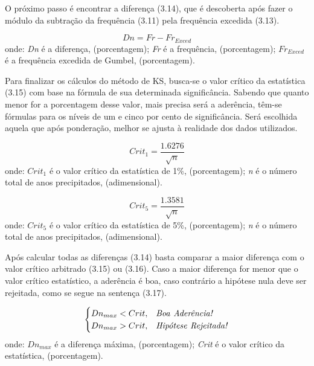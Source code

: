 O próximo passo é encontrar a diferença (3.14), que é descoberta após fazer o módulo da subtração da frequência (3.11) pela frequência excedida (3.13).\bigskip

\begin{equation}
Dn = Fr - Fr_{Exced}
\end{equation}
\newline
onde:
\newline
\textit{Dn} é a diferença, (porcentagem);
\newline
\textit{Fr} é a frequência, (porcentagem);
\newline
$Fr_{Exced}$ é a frequência excedida de Gumbel, (porcentagem).\bigskip

Para finalizar os cálculos do método de KS, busca-se o valor crítico da estatística (3.15) com base na fórmula de sua determinada significância. Sabendo que quanto menor for a porcentagem desse valor, mais precisa será a aderência, têm-se fórmulas para os níveis de um e cinco por cento de significância. Será escolhida aquela que após ponderação, melhor se ajusta à realidade dos dados utilizados.\bigskip

\begin{equation}
Crit_1 = \frac{1.6276}{\sqrt{n}}
\end{equation}
\newline
onde:
\newline
$Crit_1$ é o valor crítico da estatística de 1\%, (porcentagem);
\newline
\textit{n} é o número total de anos precipitados, (adimensional).\bigskip

\begin{equation}
Crit_5 = \frac{1.3581}{\sqrt{n}}
\end{equation}
\newline
onde:
\newline
$Crit_5$ é o valor crítico da estatística de 5\%, (porcentagem);
\newline
\textit{n} é o número total de anos precipitados, (adimensional).\bigskip

Após calcular todas as diferenças (3.14) basta comparar a maior diferença com o valor crítico arbitrado (3.15) ou (3.16). Caso a maior diferença for menor que o valor crítico estatístico, a aderência é boa, caso contrário a hipótese nula deve ser rejeitada, como se segue na sentença (3.17).\bigskip

\begin{equation}
\begin{cases}
Dn_{max}<Crit,&\mbox{\textit{Boa }}\mbox{\textit{Aderência!}} \\
Dn_{max}>Crit,&\mbox{\textit{Hipótese }}\mbox{\textit{Rejeitada!}}
\end{cases}
\end{equation}
\newline
onde:
\newline
$Dn_{max}$ é a diferença máxima, (porcentagem);
\newline
\textit{Crit} é o valor crítico da estatística, (porcentagem).\bigskip

